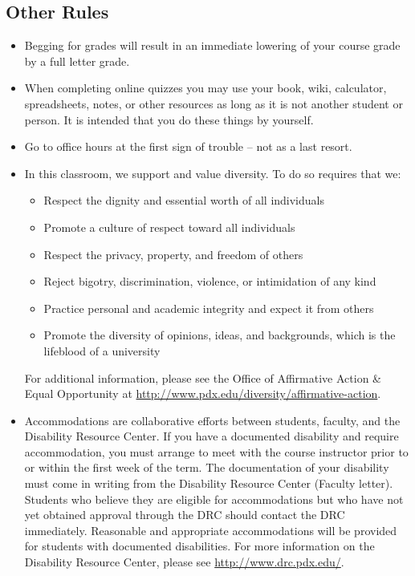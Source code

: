 \documentclass[letterpaper,10pt]{article}
\begin{document}
\subsection{Other Rules}
\begin{itemize}


\item Begging for grades will result in an immediate lowering of your
  course grade by a full letter grade.
  
  \item When completing online quizzes you may use your book, wiki, calculator, spreadsheets, notes, or other resources as long as it is not another student or person.  It is intended that you do these things by yourself.
  
  

\item Go to office hours at the first sign of trouble -- not as a last
  resort.

\item In this classroom, we support and value diversity.  To do so requires that we:
\begin{itemize}
   \item Respect the dignity and essential worth of all individuals
   \item Promote a culture of respect toward all individuals
    \item Respect the privacy, property, and freedom of others
    \item Reject bigotry, discrimination, violence, or intimidation of any kind
    \item Practice personal and academic integrity and expect it from others
   \item Promote the diversity of opinions, ideas, and backgrounds, which is
    the lifeblood of a university
\end{itemize}

 For additional information, please see the Office of Affirmative Action \& Equal Opportunity at \url{http://www.pdx.edu/diversity/affirmative-action}.


\item Accommodations are collaborative efforts between students, faculty, and the Disability Resource Center.  If you have a documented disability and require accommodation, you must arrange to meet with the course instructor prior to or within the first week of the term.  The documentation of your disability must come in writing from the Disability Resource Center (Faculty letter).  Students who believe they are eligible for accommodations but who have not yet obtained approval through the DRC should contact the DRC immediately.  Reasonable and appropriate accommodations will be provided for students with documented disabilities.  For more information on the Disability Resource Center, please see \url{http://www.drc.pdx.edu/}. 


\end{itemize}
\end{document}

